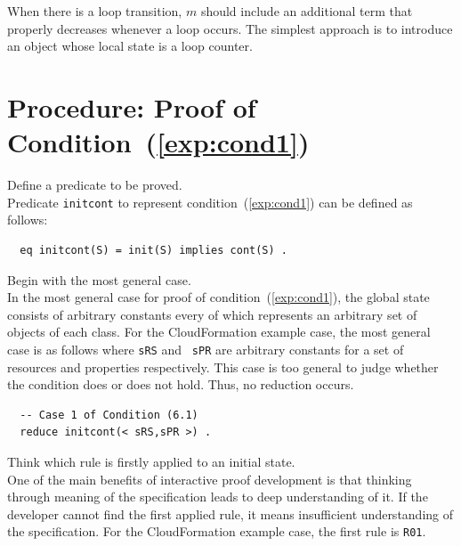 \documentclass[12pt]{report}
\begin{document}
When there is a loop transition, $m$ should include an additional term
that properly decreases whenever a loop occurs. The simplest approach
is to introduce an object whose local state is a loop counter.

\section{Procedure: Proof of Condition~(\ref{exp:cond1})}
\label{sec:initcont}
 Define a predicate to be proved. \\
Predicate {\tt initcont} to represent condition~(\ref{exp:cond1}) can be defined as follows:
\begin{verbatim}
  eq initcont(S) = init(S) implies cont(S) .
\end{verbatim}
 Begin with the most general case. \\ In the
most general case for proof of condition~(\ref{exp:cond1}), the global
state consists of arbitrary constants every of which represents an
arbitrary set of objects of each class. For the CloudFormation example
case, the most general case is as follows where {\tt sRS} and {\tt
  sPR} are arbitrary constants for a set of resources and properties
respectively.  This case is too general to judge whether the condition
does or does not hold. Thus, no reduction occurs.
\begin{verbatim}
  -- Case 1 of Condition (6.1)
  reduce initcont(< sRS,sPR >) .
\end{verbatim}

 Think which rule is firstly applied to an
initial state. \\ One of the main benefits of interactive proof
development is that thinking through meaning of the specification
leads to deep understanding of it. If the developer cannot find the
first applied rule, it means insufficient understanding of the
specification. For the CloudFormation example case, the first rule is
{\tt R01}. \\
\end{document}
